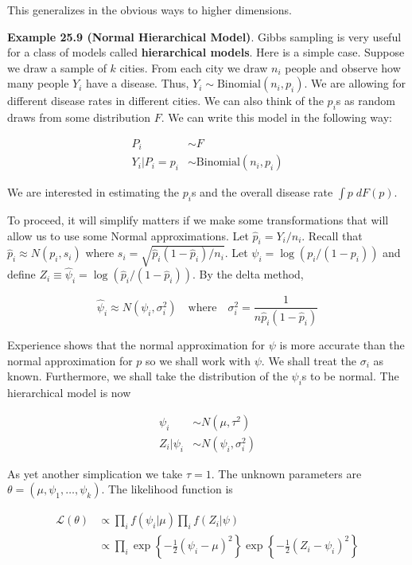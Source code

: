 This generalizes in the obvious ways to higher dimensions.

\textbf{Example 25.9 (Normal Hierarchical Model)}. Gibbs sampling is
very useful for a class of models called \textbf{hierarchical models}.
Here is a simple case. Suppose we draw a sample of \(k\) cities. From
each city we draw \(n_{i}\) people and observe how many people \(Y_{i}\)
have a disease. Thus, \(Y_{i} \sim \text{Binomial}(n_{i}, p_{i})\). We are
allowing for different disease rates in different cities. We can also
think of the \(p_{i}\)s as random draws from some distribution \(F\). We
can write this model in the following way:

\begin{align*}
P_{i} &\sim F \\
Y_{i} | P_{i} = p_{i} &\sim \text{Binomial}(n_{i}, p_{i})
\end{align*}

We are interested in estimating the \(p_{i}\)s and the overall disease
rate \(\int p \; dF(p)\).

To proceed, it will simplify matters if we make some transformations
that will allow us to use some Normal approximations. Let
\(\hat{p}_{i} = Y_{i} / n_{i}\). Recall that \(\hat{p}_{i} \approx N(p_{i}, s_{i})\)
where \(s_{i} = \sqrt{\hat{p}_{i} (1 - \hat{p}_{i}) / n_{i}}\). Let
\(\psi_{i} = \log (p_{i} / (1 - p_{i}))\) and define
\(Z_{i} \equiv \hat{\psi}_{i} = \log (\hat{p}_{i} / (1 - \hat{p}_{i}))\). By the
delta method,

\[ \hat{\psi}_{i} \approx N(\psi_{i}, \sigma_{i}^{2}) \quad \text{where} \quad \sigma_{i}^{2} = \frac{1}{n \hat{p}_{i} (1 - \hat{p}_{i})}\]

Experience shows that the normal approximation for \(\psi\) is more
accurate than the normal approximation for \(p\) so we shall work with
\(\psi\). We shall treat the \(\sigma_{i}\) as known. Furthermore, we
shall take the distribution of the \(\psi_{i}\)s to be normal. The
hierarchical model is now

\begin{align*}
\psi_{i} &\sim N(\mu, \tau^{2}) \\
Z_{i} | \psi_{i} &\sim N(\psi_{i}, \sigma_{i}^{2})
\end{align*}

As yet another simplication we take \(\tau = 1\). The unknown parameters
are \(\theta = (\mu, \psi_{1}, \dots, \psi_{k})\). The likelihood function
is

\begin{align*}
\mathcal{L}(\theta) 
&\propto \prod_{i} f(\psi_{i} | \mu) \prod_{i} f(Z_{i} | \psi) \\
&\propto \prod _{i} \exp \left\{-\frac{1}{2} (\psi_{i} - \mu)^{2} \right\} \exp \left\{ -\frac{1}{2} (Z_{i} - \psi_{i})^{2} \right\}
\end{align*}

